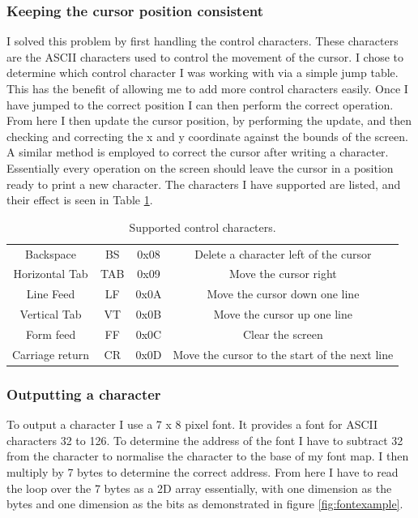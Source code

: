 \subsubsection{Keeping the cursor position consistent}
I solved this problem by first handling the control characters. These characters are the ASCII characters used to control the movement of the cursor. I chose to determine which control character I was working with via a simple jump table. This has the benefit of allowing me to add more control characters easily. Once I have jumped to the correct position I can then perform the correct operation. From here I then update the cursor position, by performing the update, and then checking and correcting the x and y coordinate against the bounds of the screen. A similar method is employed to correct the cursor after writing a character. Essentially every operation on the screen should leave the cursor in a position ready to print a new character. The characters I have supported are listed, and their effect is seen in Table \ref{controlcharacters}.
\begin{table}[H]
	\centering
	\caption{Supported control characters.\label{controlcharacters}}
	\begin{tabular}{|c|c|c|c|}
		\hline
		Backspace & BS & 0x08 & Delete a character left of the cursor \\
		Horizontal Tab & TAB & 0x09 & Move the cursor right \\
		Line Feed & LF & 0x0A & Move the cursor down one line \\
		Vertical Tab & VT & 0x0B & Move the cursor up one line \\
		Form feed & FF & 0x0C & Clear the screen \\
		Carriage return & CR & 0x0D & Move the cursor to the start of the next line \\
		\hline
	\end{tabular}
\end{table}
\subsubsection{Outputting a character}
To output a character I use a 7 x 8 pixel font. It provides a font for ASCII characters 32 to 126. To determine the address of the font I have to subtract 32 from the character to normalise the character to the base of my font map. I then multiply by 7 bytes to determine the correct address. From here I have to read the loop over the 7 bytes as a 2D array essentially, with one dimension as the bytes and one dimension as the bits as demonstrated in figure \ref{fig:fontexample}.


